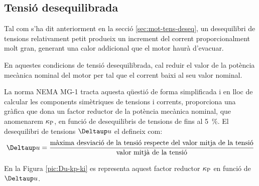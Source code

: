 \subsection{Tensió desequilibrada}\label{sec:NEMA-U-deseq}

Tal com s'ha dit anteriorment en la secció \ref{sec:mot-tens-deseq}, un desequilibri de tensions relativament petit produeix un increment del corrent proporcionalment molt gran, generant una  calor addicional que el motor haurà d'evacuar.

En aquestes condicions de tensió desequilibrada, cal reduir el valor de la potència mecànica nominal del motor per tal que el corrent baixi al seu valor nominal.

La norma NEMA MG-1 tracta aquesta qüestió de forma simplificada i en lloc de calcular les components simètriques de tensions i corrents, proporciona una gràfica que dona un factor reductor de la potència mecànica nominal, que anomenarem $\kappa_\mathrm{P}$, en funció de desequilibris de tensions de fins al \SI{5}{\%}. El desequilibri de tensions $\Deltaup u$ el defineix com:
\[
    \Deltaup u = \frac{\text{màxima desviació de la tensió respecte del valor mitja de la tensió}}{\text{valor mitjà de la tensió}}
\]

En la Figura \vref{pic:Du-kp-ki} es representa aquest factor reductor $\kappa_\mathrm{P}$ en funció de $\Deltaup u$.

\begin{center}
    
    \label{pic:Du-kp-ki}
\end{center}


